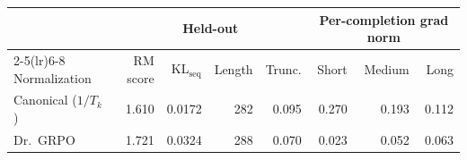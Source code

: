 \begin{tabular}{lrrrrrrr}
\toprule
 & \multicolumn{4}{c}{Held-out} & \multicolumn{3}{c}{Per-completion grad norm} \\
\cmidrule(lr){2-5}\cmidrule(lr){6-8}
Normalization & RM score & KL$_\text{seq}$ & Length & Trunc. & Short & Medium & Long \\
\midrule
Canonical ($1/T_k$) & 1.610 & 0.0172 & 282 & 0.095 & 0.270 & 0.193 & 0.112 \\
Dr.~GRPO & 1.721 & 0.0324 & 288 & 0.070 & 0.023 & 0.052 & 0.063 \\
\bottomrule
\end{tabular}
